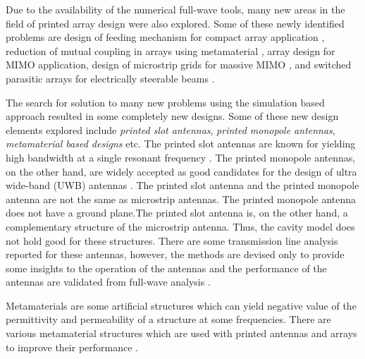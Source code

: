Due to the availability of the numerical full-wave tools, many new areas in the field of printed array design were also explored. Some of these newly identified problems are design of feeding mechanism for compact array application \cite{CompFeed01, CompFeed02}, reduction of mutual coupling in arrays using metamaterial \cite{mcEBG, mcCSRR, mcFSRR, mimoSRR}, array design for MIMO application, design of microstrip grids for massive MIMO \cite{mimoSRR, mimoRenonf}, and switched parasitic arrays for electrically steerable beams \cite{spa01,spaMems}.

The search for solution to many new problems using the simulation based approach resulted in some completely new designs. Some of these new design elements explored include \emph{printed slot antennas}, \emph{printed monopole antennas}, \emph{metamaterial based designs} etc. The printed slot antennas are known for yielding high bandwidth at a single resonant frequency \cite{PSA1}. The printed monopole antennas, on the other hand, are widely accepted as good candidates for the design of ultra wide-band (UWB) antennas \cite{PMA01}. The printed slot antenna and the printed monopole antenna are not the same as microstrip antennas. The printed monopole antenna does not have a ground plane.The printed slot antenna is, on the other hand, a complementary structure of the microstrip antenna. Thus, the cavity model does not hold good for these structures. There are some transmission line analysis reported for these antennas, however, the methods are devised only to provide some insights to the operation of the antennas and the performance of the antennas are validated from full-wave analysis \cite{slotAnalysis, pmaCSRR}.

Metamaterials are some artificial structures which can yield negative value of the permittivity and permeability of a structure at some frequencies. There are various metamaterial structures which are used with printed antennas and arrays to improve their performance \cite{mtmReview1, mtmReview2}.

